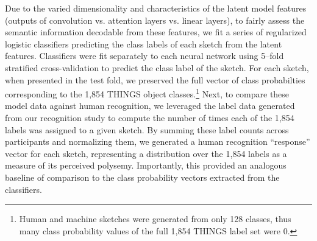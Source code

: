 \documentclass[10pt,letterpaper]{article}
\begin{document}
Due to the varied dimensionality and characteristics of the latent model features (outputs of convolution vs. attention layers vs. linear layers), to fairly assess the semantic information decodable from these features, we fit a series of regularized logistic classifiers predicting the class labels of each sketch from the latent features.
Classifiers were fit separately to each neural network using 5--fold stratified cross-validation to predict the class label of the sketch. 
For each sketch, when presented in the test fold, we preserved the full vector of class probabilties corresponding to the 1,854 THINGS object classes.\footnote{Human and machine sketches were generated from only 128 classes, thus many class probability values of the full 1,854 THINGS label set were 0.}
Next, to compare these model data against human recognition, we leveraged the label data generated from our recognition study to compute the number of times each of the 1,854 labels was assigned to a given sketch.
By summing these label counts across participants and normalizing them, we generated a human recognition ``response'' vector for each sketch, representing a distribution over the 1,854 labels as a measure of its perceived polysemy. 
Importantly, this provided an analogous baseline of comparison to the class probability vectors extracted from the classifiers.
\end{document}

